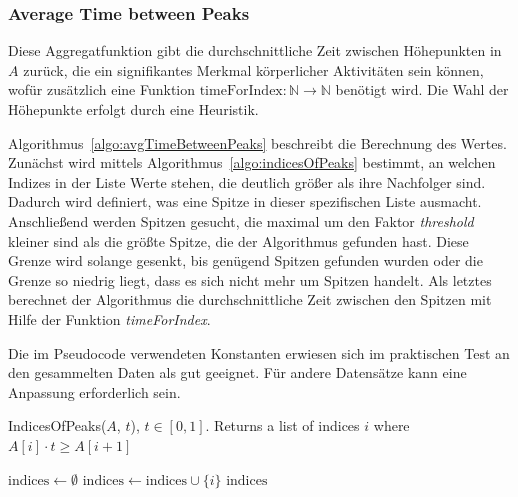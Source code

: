 \subsubsection{Average Time between Peaks}
Diese Aggregatfunktion gibt die durchschnittliche Zeit zwischen Höhepunkten in $A$ zurück, die ein signifikantes Merkmal körperlicher Aktivitäten sein können, wofür zusätzlich eine Funktion $\text{timeForIndex}: \mathbb{N} \to \mathbb{N}$ benötigt wird. Die Wahl der Höhepunkte erfolgt durch eine Heuristik. 

Algorithmus~\ref{algo:avgTimeBetweenPeaks} beschreibt die Berechnung des Wertes. Zunächst wird mittels Algorithmus~\ref{algo:indicesOfPeaks} bestimmt, an welchen Indizes in der Liste Werte stehen, die deutlich größer als ihre Nachfolger sind. Dadurch wird definiert, was eine Spitze in dieser spezifischen Liste ausmacht. Anschließend werden Spitzen gesucht, die maximal um den Faktor \textit{threshold} kleiner sind als die größte Spitze, die der Algorithmus gefunden hast. Diese Grenze wird solange gesenkt, bis genügend Spitzen gefunden wurden oder die Grenze so niedrig liegt, dass es sich nicht mehr um Spitzen handelt. Als letztes berechnet der Algorithmus die durchschnittliche Zeit zwischen den Spitzen mit Hilfe der Funktion \textit{timeForIndex}.

Die im Pseudocode verwendeten Konstanten erwiesen sich im praktischen Test an den gesammelten Daten als gut geeignet. Für andere Datensätze kann eine Anpassung erforderlich sein.

\begin{algorithm}
    \caption{IndicesOfPeaks($A$, $t$), $t \in [0,1]$. Returns a list of indices $i$ where $A[i] \cdot t \geq A[i+1]$}
    \label{algo:indicesOfPeaks}
    \begin{algorithmic}
        \State $\text{indices} \gets \emptyset$
                \State $\text{indices} \gets \text{indices} \cup \{i\}$
            \EndIf
        \EndFor
        \State \Return $\text{indices}$
    \end{algorithmic}
\end{algorithm}

